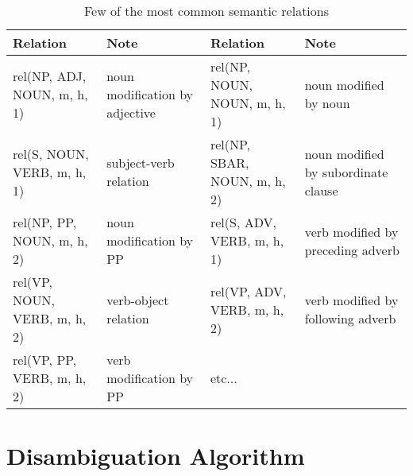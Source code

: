 \begin{table}[t]
  \leavevmode
    \caption{Few of the most common semantic relations}
    \label{tab:4}
  \begin{center}
\small
\begin{tabular}[c]{|p{3.1cm}|p{2.9cm}|p{3.2cm}|p{3.1cm}|}\hline
Relation & Note & Relation & Note \\\hline
 rel(NP, ADJ, NOUN, m, h, 1) & noun modification by adjective & rel(NP, NOUN, NOUN, m, h, 1) & noun modified by noun \\\hline
 rel(S, NOUN, VERB, m, h, 1) & subject-verb relation & rel(NP, SBAR, NOUN, m, h, 2) & noun modified by subordinate clause \\\hline
 rel(NP, PP, NOUN, m, h, 2) & noun modification by PP & rel(S, ADV, VERB, m, h, 1) & verb modified by preceding adverb \\\hline
 rel(VP, NOUN, VERB, m, h, 2) & verb-object relation & rel(VP, ADV, VERB, m, h, 2) & verb modified by following adverb \\\hline
 rel(VP, PP, VERB, m, h, 2) & verb modification by PP & etc... & \\\hline
\end{tabular}
\end{center}
\end{table}


\section{Disambiguation Algorithm}


